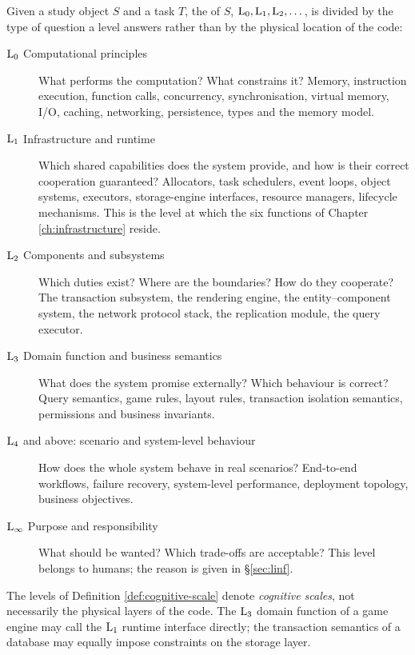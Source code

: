 \begin{definition}\label{def:cognitive-scale}
Given a study object $S$ and a task $T$, the  of $S$,
$\mathrm{L}_{0}, \mathrm{L}_{1}, \mathrm{L}_{2}, \dots$, is divided by the type of question a level answers rather
than by the physical location of the code:
\begin{description}
\item[$\mathrm{L}_{0}$ Computational principles] What performs the computation? What constrains it?
      Memory, instruction execution, function calls, concurrency, synchronisation, virtual
      memory, I/O, caching, networking, persistence, types and the memory model.
\item[$\mathrm{L}_{1}$ Infrastructure and runtime] Which shared capabilities does the system
      provide, and how is their correct cooperation guaranteed? Allocators, task schedulers,
      event loops, object systems, executors, storage-engine interfaces, resource managers,
      lifecycle mechanisms. This is the level at which the six functions of
      Chapter \ref{ch:infrastructure} reside.
\item[$\mathrm{L}_{2}$ Components and subsystems] Which duties exist? Where are the boundaries? How
      do they cooperate? The transaction subsystem, the rendering engine, the
      entity--component system, the network protocol stack, the replication module, the query
      executor.
\item[$\mathrm{L}_{3}$ Domain function and business semantics] What does the system promise
      externally? Which behaviour is correct? Query semantics, game rules, layout rules,
      transaction isolation semantics, permissions and business invariants.
\item[$\mathrm{L}_{4}$ and above: scenario and system-level behaviour] How does the whole system
      behave in real scenarios? End-to-end workflows, failure recovery, system-level
      performance, deployment topology, business objectives.
\item[$\mathrm{L}_{\infty}$ Purpose and responsibility] What should be wanted? Which trade-offs are
      acceptable? This level belongs to humans; the reason is given in \S\ref{sec:linf}.
\end{description}
\end{definition}

\begin{principle}\label{pr:not-physical}
The levels of Definition \ref{def:cognitive-scale} denote \emph{cognitive scales}, not
necessarily the physical layers of the code. The $\mathrm{L}_{3}$ domain function of a game engine
may call the $\mathrm{L}_{1}$ runtime interface directly; the transaction semantics of a database may
equally impose constraints on the storage layer.
\end{principle}

